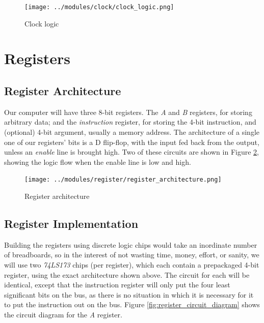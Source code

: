 \documentclass[12pt]{article}
\begin{document}
\begin{FlushLeft}
\begin{figure}[h]
  \begin{center}
    \texttt{[image: ../modules/clock/clock\_logic.png]}
    \caption{Clock logic}
    \label{fig:clock_logic_diagram}
  \end{center}
\end{figure}

\clearpage



\section{Registers}
\subsection{Register Architecture}
Our computer will have three 8-bit registers. The \textit{A} and \textit{B} registers, for storing arbitrary data; and the \textit{instruction} register, for storing the 4-bit instruction, and (optional) 4-bit argument, usually a memory address. The architecture of a single one of our registers' bits is a D flip-flop, with the input fed back from the output, unless an \textit{enable} line is brought high. Two of these circuits are shown in Figure \ref{fig:register_architecture}, showing the logic flow when the enable line is low and high. \\

\begin{figure}[h]
  \begin{center}
    \texttt{[image: ../modules/register/register\_architecture.png]}
    \caption{Register architecture}
    \label{fig:register_architecture}
  \end{center}
\end{figure}

\clearpage


\subsection{Register Implementation}
Building the registers using discrete logic chips would take an inordinate number of breadboards, so in the interest of not wasting time, money, effort, or sanity, we will use two \textit{74LS173} chips (per register), which each contain a prepackaged 4-bit register, using the exact architecture shown above. The circuit for each will be identical, except that the instruction register will only put the four least significant bits on the bus, as there is no situation in which it is necessary for it to put the instruction out on the bus. Figure \ref{fig:register_circuit_diagram} shows the circuit diagram for the \textit{A} register. \\


\end{FlushLeft}
\end{document}
